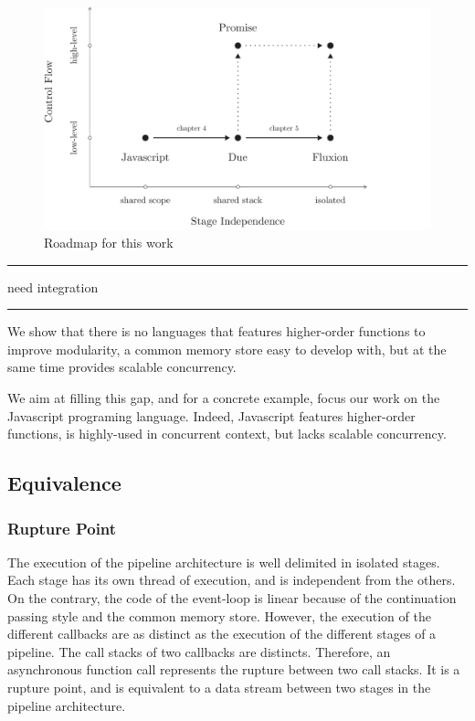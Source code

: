 \begin{figure}[h!]
\includegraphics[width=1\textwidth]{../ressources/roadmap.pdf}
\caption{Roadmap for this work}
\label{fig:chapter3:objectives:roadmap}
\end{figure}

\begin{center}
\rule{3cm}{0.4pt}
need integration
\rule{3cm}{0.4pt}
\end{center}

We show that there is no languages that features higher-order functions to improve modularity, a common memory store easy to develop with, but at the same time provides scalable concurrency.

We aim at filling this gap, and for a concrete example, focus our work on the Javascript programing language.
Indeed, Javascript features higher-order functions, is highly-used in concurrent context, but lacks scalable concurrency.








\subsection{Equivalence}

\subsubsection{Rupture Point}

The execution of the pipeline architecture is well delimited in isolated stages.
Each stage has its own thread of execution, and is independent from the others.
On the contrary, the code of the event-loop is linear because of the continuation passing style and the common memory store.
However, the execution of the different callbacks are as distinct as the execution of the different stages of a pipeline.
The call stacks of two callbacks are distincts.
Therefore, an asynchronous function call represents the rupture between two call stacks.
It is a rupture point, and is equivalent to a data stream between two stages in the pipeline architecture.

